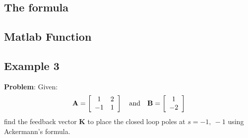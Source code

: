 \subsection*{The formula} %
\label{sub:the_formula}


\ifslidesonly
\begin{slide}
   
\end{slide}
\fi


\ifslidesonly
\begin{slide}
   
\end{slide}
\fi


\ifslidesonly
\begin{slide}
   
\end{slide}
\fi

\subsection*{Matlab Function}

\ifslidesonly
\begin{slide}
   
\end{slide}
\fi

 
\subsection*{Example 3} %
\label{ssec:example_2}

\textbf{Problem}: 
Given:
\[
{\bf{A}} = \left[ {\begin{array}{*{20}c}
   1 & 2  \\
   { - 1} & 1  \\
\end{array}} \right]\quad {\rm{and}}\quad {\bf{B}} = \left[ {\begin{array}{*{20}c}
   1  \\
   { - 2}  \\
\end{array}} \right]
\]
find the feedback vector $\mathbf{K}$ to place the closed loop poles at $s = -1,\ -1$ using Ackermann's formula.

